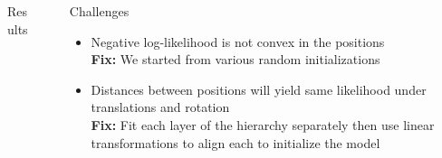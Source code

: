 \documentclass[final]{beamer}
\newlength{\sepwid}
\newlength{\onecolwid}
\newlength{\twocolwid}
\begin{document}
\begin{frame}[t]
\begin{columns}[t]
\begin{column}{\twocolwid}
\begin{columns}[t,totalwidth=\twocolwid]
\begin{column}{\onecolwid}
\begin{block}{Results}
\end{block}


\end{column} %

\end{columns} %

\end{column} %

\begin{column}{\sepwid}\end{column} %

\begin{column}{\onecolwid} %

  \begin{block}{Challenges}

    \begin{itemize}
    \item Negative log-likelihood is not convex in the positions\\
      \textbf{Fix:} We started from various random initializations
    \item Distances between positions will yield same likelihood under
      translations and rotation\\
      \textbf{Fix:} Fit each layer of the hierarchy separately then
      use linear transformations to align each to initialize the model
    \end{itemize}

\end{block}


%
%




\end{column}
\end{columns}
\end{frame}
\end{document}
